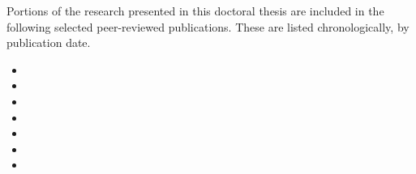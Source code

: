 
\begin{preamble}
Portions of the research presented in this doctoral thesis are included in the following selected peer-reviewed publications. These are listed chronologically, by publication date.

\begin{itemize}
    \item{}
    \item{}
    \item{}
    \item{}
    \item{}
    \item{}
    \item{}
\end{itemize}

\end{preamble}